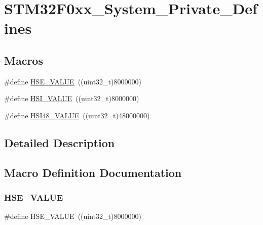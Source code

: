 \hypertarget{group___s_t_m32_f0xx___system___private___defines}{}\section{S\+T\+M32\+F0xx\+\_\+\+System\+\_\+\+Private\+\_\+\+Defines}
\label{group___s_t_m32_f0xx___system___private___defines}
\subsection*{Macros}
\begin{DoxyCompactItemize}
\item 
\#define \hyperlink{group___s_t_m32_f0xx___system___private___defines_gaeafcff4f57440c60e64812dddd13e7cb}{H\+S\+E\+\_\+\+V\+A\+L\+UE}~((uint32\+\_\+t)8000000)
\item 
\#define \hyperlink{group___s_t_m32_f0xx___system___private___defines_gaaa8c76e274d0f6dd2cefb5d0b17fbc37}{H\+S\+I\+\_\+\+V\+A\+L\+UE}~((uint32\+\_\+t)8000000)
\item 
\#define \hyperlink{group___s_t_m32_f0xx___system___private___defines_ga47f01e5e3f2edfa94bf74c08835f3875}{H\+S\+I48\+\_\+\+V\+A\+L\+UE}~((uint32\+\_\+t)48000000)
\end{DoxyCompactItemize}


\subsection{Detailed Description}


\subsection{Macro Definition Documentation}
\mbox{\label{group___s_t_m32_f0xx___system___private___defines_gaeafcff4f57440c60e64812dddd13e7cb}} 
\subsubsection{\texorpdfstring{H\+S\+E\+\_\+\+V\+A\+L\+UE}{HSE\_VALUE}}
{\footnotesize\ttfamily \#define H\+S\+E\+\_\+\+V\+A\+L\+UE~((uint32\+\_\+t)8000000)}

